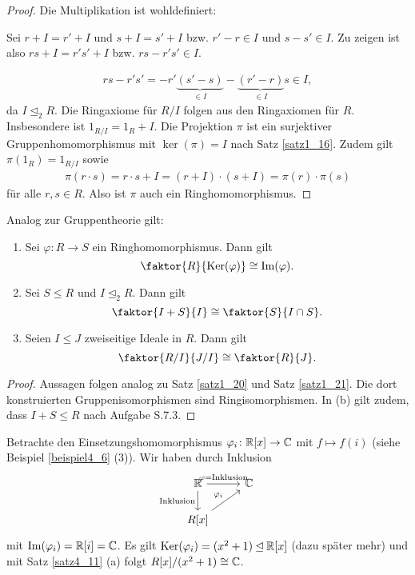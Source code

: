 \begin{proof}
	Die Multiplikation ist wohldefiniert:
	
	Sei $r + I = r' + I$ und $s+I = s'+I$ bzw. $r' - r \in I$ und $s - s' \in I$. Zu zeigen ist also $rs + I = r's' + I$ bzw. $rs - r's' \in I$.
	
	\begin{align*}
		rs - r's' = -r'\underbrace{(s' - s)}_{\in I} - \underbrace{(r' - r)}_{\in I} s \in I,
	\end{align*}
	da $I \unlhd_2 R$. Die Ringaxiome für $R/I$ folgen aus den Ringaxiomen für $R$. Insbesondere ist $1_{R/I} = 1_R + I$. Die Projektion $\pi$ ist ein surjektiver Gruppenhomomorphismus mit  $\ker(\pi) = I$ nach Satz \ref{satz1_16}. Zudem gilt $\pi(1_R) = 1_{R/I}$ sowie
	\begin{align*}
		\pi(r\cdot s) = r \cdot s + I = (r+I)\cdot(s + I) = \pi(r) \cdot \pi(s)
	\end{align*}
	für alle $r,s \in R$. Also ist $\pi$ auch ein Ringhomomorphismus.
\end{proof}
Analog zur Gruppentheorie gilt:
\begin{satz}\label{satz4_11}
	\begin{enumerate}[label=(\alph*)]
		\item Sei $\varphi \colon R \to S$ ein Ringhomomorphismus. Dann gilt
		\[\faktor{R}{\ker(\varphi)} \cong \im(\varphi).\]
		\item Sei $S \leq R$ und $I \unlhd_2 R$. Dann gilt
		\[\faktor{I+S}{I} \cong \faktor{S}{I \cap S}.\]
		\item Seien $I \leq J$ zweiseitige Ideale in $R$. Dann gilt
		\[\faktor{R/I}{J/I} \cong \faktor{R}{J}.\]
	\end{enumerate}
\end{satz}
\begin{proof}
	Aussagen folgen analog zu Satz \ref{satz1_20} und Satz \ref{satz1_21}. Die dort konstruierten Gruppenisomorphismen sind Ringisomorphismen. In (b) gilt zudem, dass $I+S \leq R$ nach Aufgabe S.7.3.
\end{proof}
\begin{beispiel}\label{beispiel4_12}
	Betrachte den Einsetzungshomomorphismus $\varphi_i \colon \mathbb{R}[x] \to \mathbb{C}$ mit $f \mapsto f(i)$ (siehe Beispiel \ref{beispiel4_6} (3)). Wir haben durch Inklusion
	\[
	\begin{tikzcd}
		\R \arrow{r}{\varphi = \text{Inklusion}} \arrow[swap]{d}{\text{Inklusion}} & \C\\
		R[x] \arrow{ur}{\varphi_i} 
	\end{tikzcd}
	\]
	mit $\mathrm{Im}(\varphi_i) = \mathbb{R}[i] = \mathbb{C}$. Es gilt $\mathrm{Ker}(\varphi_i) = (x^2 + 1) \unlhd \mathbb{R}[x]$ (dazu später mehr) und mit Satz \ref{satz4_11} (a) folgt $R[x] /(x^2 + 1) \cong \mathbb{C}$.
\end{beispiel}
